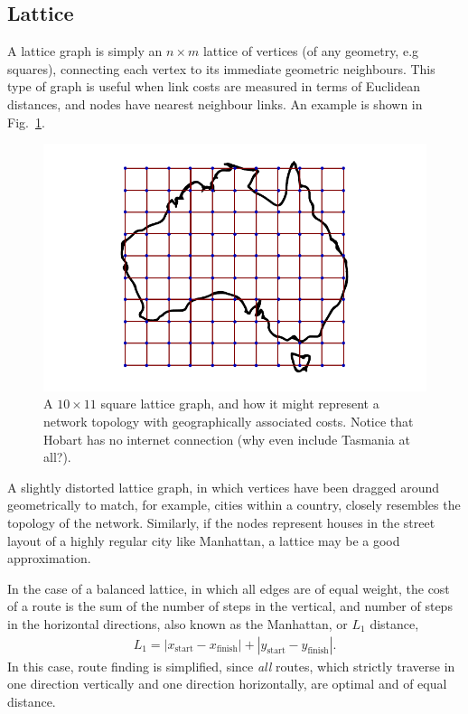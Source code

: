\documentclass[aps,rmp,twocolumn,amsmath,amssymb,nofootinbib,superscriptaddress,longbibliography,floatfix]{revtex4-1}
\begin{document}
%
%

\subsection{Lattice}

A lattice graph is simply an \mbox{$n\times m$} lattice of vertices (of any geometry, e.g squares), connecting each vertex to its immediate geometric neighbours. This type of graph is useful when link costs are measured in terms of Euclidean distances, and nodes have nearest neighbour links. An example is shown in Fig.~\ref{fig:lattice}.

\begin{figure}[!htb]
\includegraphics[width=0.7\columnwidth]{lattice}
\caption{A \mbox{$10\times 11$} square lattice graph, and how it might represent a network topology with geographically associated costs. Notice that Hobart has no internet connection (why even include Tasmania at all?).} \label{fig:lattice}
\end{figure}

A slightly distorted lattice graph, in which vertices have been dragged around geometrically to match, for example, cities within a country, closely resembles the topology of the network. Similarly, if the nodes represent houses in the street layout of a highly regular city like Manhattan, a lattice may be a good approximation.

In the case of a balanced lattice, in which all edges are of equal weight, the cost of a route is the sum of the number of steps in the vertical, and number of steps in the horizontal directions, also known as the Manhattan, or $L_1$ distance,
\begin{align}
L_1 = |x_\mathrm{start} - x_\mathrm{finish}| + |y_\mathrm{start} - y_\mathrm{finish}|.
\end{align}
In this case, route finding is simplified, since \emph{all} routes, which strictly traverse in one direction vertically and one direction horizontally, are optimal and of equal distance.
\end{document}
